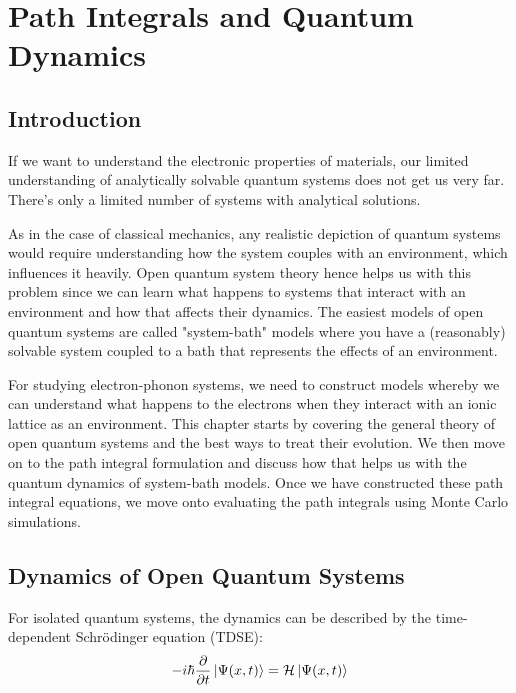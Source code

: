 
\section{Path Integrals and Quantum Dynamics} %


\subsection{Introduction}

If we want to understand the electronic properties of materials, our limited understanding of analytically solvable quantum systems does not get us very far. There's only a limited number of systems with analytical solutions.

As in the case of classical mechanics, any realistic depiction of quantum systems would require understanding how the system couples with an environment, which influences it heavily. Open quantum system theory hence helps us with this problem since we can learn what happens to systems that interact with an environment and how that affects their dynamics. The easiest models of open quantum systems are called "system-bath" models where you have a (reasonably) solvable system coupled to a bath that represents the effects of an environment.

For studying electron-phonon systems, we need to construct models whereby we can understand what happens to the electrons when they interact with an ionic lattice as an environment. This chapter starts by covering the general theory of open quantum systems and the best ways to treat their evolution. We then move on to the path integral formulation and discuss how that helps us with the quantum dynamics of system-bath models. Once we have constructed these path integral equations, we move onto evaluating the path integrals using Monte Carlo simulations. 


\subsection{Dynamics of Open Quantum Systems}

For isolated quantum systems, the dynamics can be described by the time-dependent Schr{\"o}dinger equation (TDSE): \begin{equation}\label{4.1} -i\hbar \frac{\partial}{\partial t} \ket{\Psi(x, t)} = \mathcal{H} \ket{\Psi(x, t)}\end{equation}

